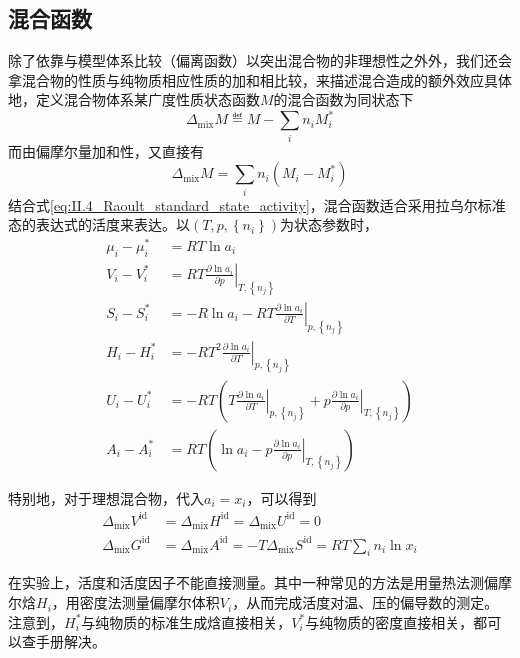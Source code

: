 \documentclass[main.tex]{subfiles}
\begin{document}
\subsection{混合函数}
除了依靠与模型体系比较（偏离函数）以突出混合物的非理想性之外外，我们还会拿混合物的性质与纯物质相应性质的加和相比较，来描述混合造成的额外效应具体地，定义混合物体系某广度性质状态函数$M$的混合函数为同状态下
\[\Delta_\text{mix}M\eqdef M-\sum_in_iM_i^*\]
而由偏摩尔量加和性，又直接有
\[\Delta_\text{mix}M=\sum_in_i\left(M_i-M_i^*\right)\]
结合式\eqref{eq:II.4_Raoult_standard_state_activity}，混合函数适合采用拉乌尔标准态的表达式的活度来表达。以$\left(T,p,\left\{n_i\right\}\right)$为状态参数时，
\begin{align}
    \mu_i-\mu_i^* & =RT\ln a_i                                                                                                                                                       \\
    V_i-V_i^*     & =RT\left.\frac{\partial\ln a_i}{\partial p}\right|_{T,\left\{n_j\right\}}                                                                                        \\
    S_i-S_i^*     & =-R\ln a_i-RT\left.\frac{\partial\ln a_i}{\partial T}\right|_{p,\left\{n_j\right\}}                                                                              \\
    H_i-H_i^*     & =-RT^2\left.\frac{\partial\ln a_i}{\partial T}\right|_{p,\left\{n_j\right\}}                                                                                     \\
    U_i-U_i^*     & =-RT\left(T\left.\frac{\partial\ln a_i}{\partial T}\right|_{p,\left\{n_j\right\}}+p\left.\frac{\partial\ln a_i}{\partial p}\right|_{T,\left\{n_j\right\}}\right) \\
    A_i-A_i^*     & =RT\left(\ln a_i-p\left.\frac{\partial\ln a_i}{\partial p}\right|_{T,\left\{n_j\right\}}\right)
\end{align}

特别地，对于理想混合物，代入$a_i=x_i$，可以得到
\begin{align}
    \Delta_\text{mix}V^\text{id} & =\Delta_\text{mix}H^\text{id}=\Delta_\text{mix}U^\text{id}=0                    \\
    \Delta_\text{mix}G^\text{id} & =\Delta_\text{mix}A^\text{id}=-T\Delta_\text{mix}S^\text{id}=RT\sum_in_i\ln x_i
\end{align}

在实验上，活度和活度因子不能直接测量。其中一种常见的方法是用量热法测偏摩尔焓$H_i$\cite{Grolier2015}，用密度法测量偏摩尔体积$V_i$，从而完成活度对温、压的偏导数的测定。注意到，$H_i^*$与纯物质的标准生成焓直接相关，$V_i^*$与纯物质的密度直接相关，都可以查手册解决。
\end{document}
